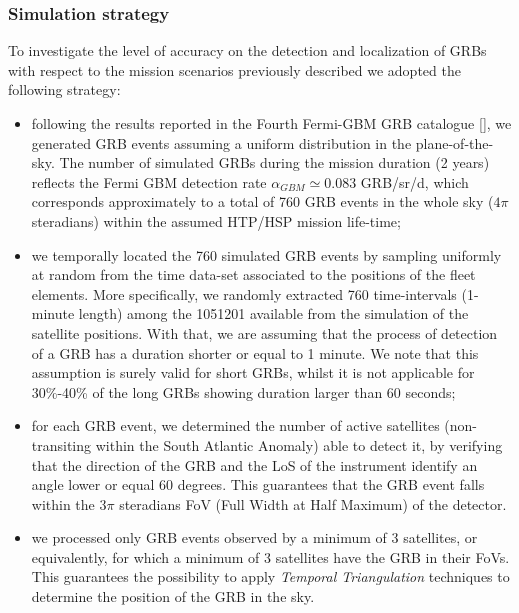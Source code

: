 \documentclass[]{spie}  %
\begin{document}
\subsubsection{Simulation strategy}
\label{sec:strat}
To investigate the level of accuracy on the detection and localization of GRBs with respect to the mission scenarios previously described we adopted the following strategy: 
\begin{itemize}
	
\item following the results reported in the Fourth Fermi-GBM GRB catalogue [], we generated GRB events assuming a uniform distribution in the plane-of-the-sky. The number of simulated GRBs during the mission duration (2 years) reflects the Fermi GBM detection rate $\alpha_{GBM} \simeq 0.083$ GRB/sr/d, which corresponds approximately to a total of 760 GRB events in the whole sky ($4\pi$ steradians) within the assumed HTP/HSP mission life-time; 

\item we temporally located the 760 simulated GRB events by sampling uniformly at random from the time data-set associated to the positions of the fleet elements. More specifically, we randomly extracted 760 time-intervals (1-minute length) among the 1051201 available from the simulation of the satellite positions. With that, we are assuming that the process of detection of a GRB has a duration shorter or equal to 1 minute. We note that this assumption is surely valid for short GRBs, whilst it is not applicable for 30\%-40\% of the long GRBs showing duration larger than 60 seconds; 

\item for each GRB event, we determined the number of active satellites (non-transiting within the South Atlantic Anomaly) able to detect it, by verifying that the direction of the GRB and the LoS of the instrument identify an angle lower or equal 60 degrees. This guarantees that the GRB event falls within the $3\pi$ steradians FoV (Full Width at Half Maximum) of the detector. 

\item we processed only GRB events observed by a minimum of 3 satellites, or equivalently, for which a minimum of 3 satellites have the GRB in their FoVs. This guarantees the possibility to apply \emph{Temporal Triangulation} techniques to determine the position of the GRB in the sky. 

\end{itemize}
\end{document}
